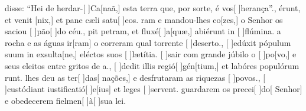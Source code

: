{    { disse: ``Hei de herdar-[ ]{Ca}[naã,] esta terra que, por sorte, é vos[ ]{he}{ran}ça''.},
  {érunt, et venit [nix,] et pane cæli satu[ ]{e}os.}%
    {ram e mandou-lhes co[zes,] o Senhor os saciou [ ]{pão}[ ]{do} céu.},
  {pit petram, et fluxé[ ]{a}[quæ,] abiérunt in [ ]{flú}mina.}%
    { a rocha e as águas ir[ram] o correram qual torrente [ ]{de}{ser}to.},
  {[ ]{e}dúxit pópulum suum in exsulta[ne,] eléctos suos [ ]{læ}{tí}tia.}%
    {[ ]{sa}ir com grande júbilo o [ ]{po}[vo,] e seus eleitos entre gritos de a.},
  {[ ]{de}dit illis regió[ ]{gén}[tium,] et labóres populórum runt.}%
    { lhes deu as ter[ ]{das}[ nações,] e desfrutaram as riquezas [ ]{po}vos.},
  {[ ]{cu}stódiant iustificatió[ ]{e}[ius] et leges [ ]{ser}\-vent.}%
    { guardarem os precei[ ]{do}[ Senhor] e obedecerem fielmen[ ]{à}[ ]{su}a lei.}
}
